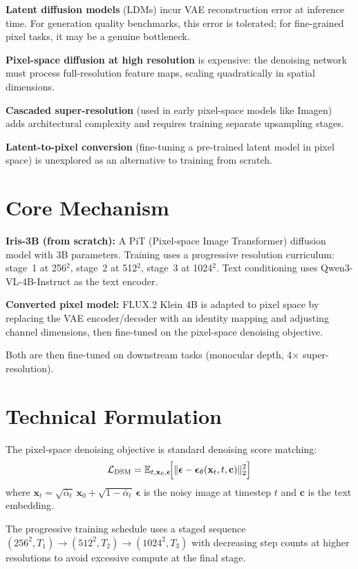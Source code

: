 \documentclass[10pt,twocolumn]{article}
\begin{document}
\textbf{Latent diffusion models} (LDMs) incur VAE reconstruction error at
inference time. For generation quality benchmarks, this error is tolerated;
for fine-grained pixel tasks, it may be a genuine bottleneck.

\textbf{Pixel-space diffusion at high resolution} is expensive: the denoising
network must process full-resolution feature maps, scaling quadratically
in spatial dimensions.

\textbf{Cascaded super-resolution} (used in early pixel-space models like
Imagen) adds architectural complexity and requires training separate upsampling
stages.

\textbf{Latent-to-pixel conversion} (fine-tuning a pre-trained latent model
in pixel space) is unexplored as an alternative to training from scratch.

\section{Core Mechanism}

\textbf{Iris-3B (from scratch):} A PiT (Pixel-space Image Transformer)
diffusion model with 3B parameters. Training uses a progressive resolution
curriculum: stage~1 at 256$^2$, stage~2 at 512$^2$, stage~3 at 1024$^2$.
Text conditioning uses Qwen3-VL-4B-Instruct as the text encoder.

\textbf{Converted pixel model:} FLUX.2 Klein 4B is adapted to pixel space
by replacing the VAE encoder/decoder with an identity mapping and adjusting
channel dimensions, then fine-tuned on the pixel-space denoising objective.

Both are then fine-tuned on downstream tasks (monocular depth, 4$\times$
super-resolution).

\section{Technical Formulation}

The pixel-space denoising objective is standard denoising score matching:
\[
\mathcal{L}_\text{DSM} = \mathbb{E}_{t,\mathbf{x}_0,\boldsymbol{\epsilon}}\!
\Bigl[\|\boldsymbol{\epsilon} - \boldsymbol{\epsilon}_\theta(\mathbf{x}_t, t, \mathbf{c})\|_2^2\Bigr]
\]
where $\mathbf{x}_t = \sqrt{\bar{\alpha}_t}\,\mathbf{x}_0 +
\sqrt{1-\bar{\alpha}_t}\,\boldsymbol{\epsilon}$ is the noisy image at timestep
$t$ and $\mathbf{c}$ is the text embedding.

The progressive training schedule uses a staged sequence
$(256^2, T_1) \to (512^2, T_2) \to (1024^2, T_3)$
with decreasing step counts at higher resolutions to avoid excessive
compute at the final stage.
\end{document}
